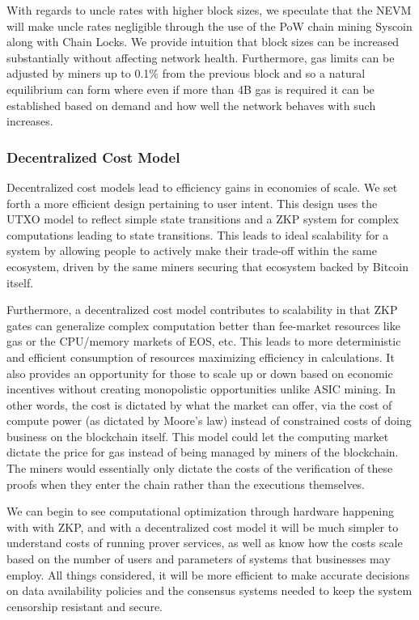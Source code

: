 \documentclass[peerreview]{ieeesyscoin}
\begin{document}
With regards to uncle rates with higher block sizes, we speculate that the NEVM will make uncle rates negligible through the use of the PoW chain mining Syscoin along with Chain Locks. We provide intuition that block sizes can be increased substantially without affecting network health. Furthermore, gas limits can be adjusted by miners up to 0.1\% from the previous block and so a natural equilibrium can form where even if more than 4B gas is required it can be established based on demand and how well the network behaves with such increases. 

\subsubsection{Decentralized Cost Model}

Decentralized cost models lead to efficiency gains in economies of scale. We set forth a more efficient design pertaining to user intent. This design uses the UTXO model to reflect simple state transitions and a ZKP system for complex computations leading to state transitions. This leads to ideal scalability for a system by allowing people to actively make their trade-off within the same ecosystem, driven by the same miners securing that ecosystem backed by Bitcoin itself.

Furthermore, a decentralized cost model contributes to scalability in that ZKP gates can generalize complex computation better than fee-market resources like gas or the CPU/memory markets of EOS, etc. This leads to more deterministic and efficient consumption of resources maximizing efficiency in calculations. It also provides an opportunity for those to scale up or down based on economic incentives without creating monopolistic opportunities unlike ASIC mining. In other words, the cost is dictated by what the market can offer, via the cost of compute power (as dictated by Moore's law) instead of constrained costs of doing business on the blockchain itself. This model could let the computing market dictate the price for gas instead of being managed by miners of the blockchain. The miners would essentially only dictate the costs of the verification of these proofs when they enter the chain rather than the executions themselves.

We can begin to see computational optimization through hardware happening with with ZKP, and with a decentralized cost model it will be much simpler to understand costs of running prover services, as well as know how the costs scale based on the number of users and parameters of systems that businesses may employ. All things considered, it will be more efficient to make accurate decisions on data availability policies and the consensus systems needed to keep the system censorship resistant and secure.
\end{document}
